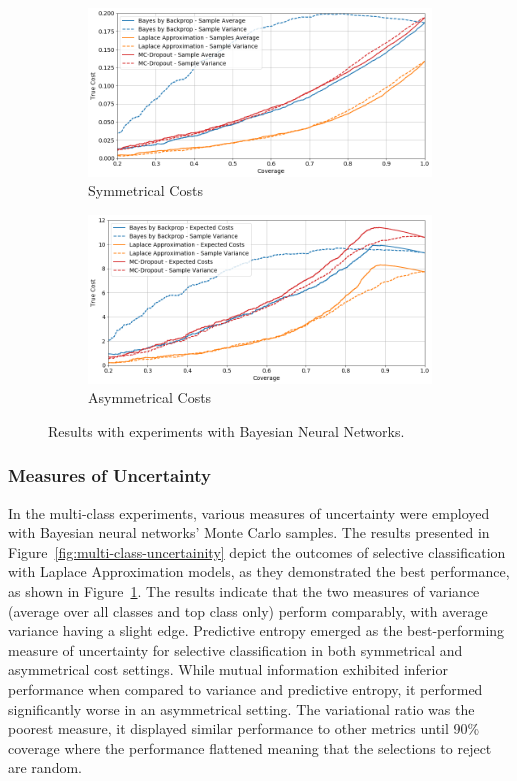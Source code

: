 \begin{figure}[!h]
	\centering
	\begin{subfigure}{\textwidth}
		\centering
		\includegraphics[width=\linewidth]{images/multi-class-bayesian-sym.png}
		\caption{Symmetrical Costs}	
	\end{subfigure}
	\begin{subfigure}{\textwidth}
		\centering
		\includegraphics[width=\linewidth]{images/multi-class-bayesian-asym.png}
		\caption{Asymmetrical Costs}
	\end{subfigure}
	\caption{Results with experiments with Bayesian Neural Networks.}
	\label{fig:multi-class-bayesian}
\end{figure}

\subsubsection{Measures of Uncertainty}
In the multi-class experiments, various measures of uncertainty were employed with Bayesian neural networks' Monte Carlo samples. The results presented in Figure~\ref{fig:multi-class-uncertainity} depict the outcomes of selective classification with Laplace Approximation models, as they demonstrated the best performance, as shown in Figure~\ref{fig:multi-class-bayesian}. The results indicate that the two measures of variance (average over all classes and top class only) perform comparably, with average variance having a slight edge. Predictive entropy emerged as the best-performing measure of uncertainty for selective classification in both symmetrical and asymmetrical cost settings. While mutual information exhibited inferior performance when compared to variance and predictive entropy, it performed significantly worse in an asymmetrical setting. The variational ratio was the poorest measure, it displayed similar performance to other metrics until 90\% coverage where the performance flattened meaning that the selections to reject are random.

